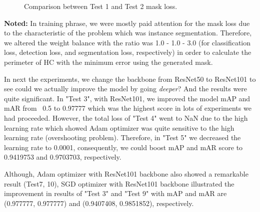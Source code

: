 	\begin{figure}[H]
		\centering
		\hfill %
		\hfill %
		\caption{Comparison between Test 1 and Test 2  mask loss.}
		\label{fig:mask_loss_12}
	\end{figure}

\noindent	
	\textbf{Noted:} In training phrase, we were mostly paid attention for the mask loss due to the characteristic of the problem which was instance segmentation. Therefore, we altered the weight balance with the ratio was 1.0 - 1.0 - 3.0 (for classification loss, detection loss, and segmentation loss, respectively) in order to calculate the perimeter of HC with the minimum error using the generated mask.
	
 	In next the experiments, we change the backbone from ResNet50 to ResNet101 to see could we actually improve the model by going \textit{deeper}? And the results were quite significant. In "Test 3", with ResNet101, we improved the model mAP and mAR from ~0.5 to 0.97777 which was the highest score in lots of experiments we had proceeded. However, the total loss of "Test 4" went to NaN due to the high learning rate which showed Adam optimizer was quite sensitive to the high learning rate (overshooting problem). Therefore, in "Test 5" we decreased the learning rate to 0.0001, consequently, we could boost mAP and mAR score to 0.9419753 and 0.9703703, respectively.
	
	Although, Adam optimizer with ResNet101 backbone also showed a remarkable result (Test7, 10), SGD optimizer with ResNet101 backbone illustrated the improvement in results of "Test 3" and "Test 9" with mAP and mAR are (0.977777, 0.977777) and (0.9407408, 0.9851852), respectively.
	
